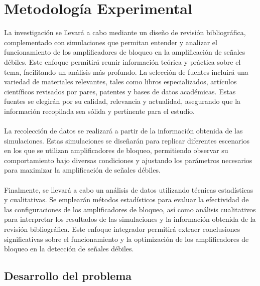 \chapter*{Metodología Experimental} %
La investigación se llevará a cabo mediante un diseño de revisión bibliográfica, complementado con simulaciones que permitan entender y analizar el funcionamiento de los amplificadores de bloqueo en la amplificación de señales débiles. Este enfoque permitirá reunir información teórica y práctica sobre el tema, facilitando un análisis más profundo. La selección de fuentes incluirá una variedad de materiales relevantes, tales como libros especializados, artículos científicos revisados por pares, patentes y bases de datos académicas. Estas fuentes se elegirán por su calidad, relevancia y actualidad, asegurando que la información recopilada sea sólida y pertinente para el estudio.\\
\\
La recolección de datos se realizará a partir de la información obtenida de las simulaciones. Estas simulaciones se diseñarán para replicar diferentes escenarios en los que se utilizan amplificadores de bloqueo, permitiendo observar su comportamiento bajo diversas condiciones y ajustando los parámetros necesarios para maximizar la amplificación de señales débiles.\\
\\
Finalmente, se llevará a cabo un análisis de datos utilizando técnicas estadísticas y cualitativas. Se emplearán métodos estadísticos para evaluar la efectividad de las configuraciones de los amplificadores de bloqueo, así como análisis cualitativos para interpretar los resultados de las simulaciones y la información obtenida de la revisión bibliográfica. Este enfoque integrador permitirá extraer conclusiones significativas sobre el funcionamiento y la optimización de los amplificadores de bloqueo en la detección de señales débiles.
\section*{Desarrollo del problema}

